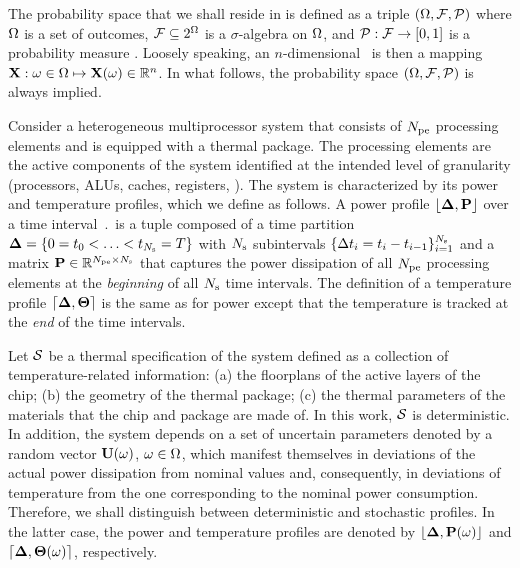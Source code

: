 The probability space that we shall reside in is defined as a triple $(\Omega, \mathcal{F}, \mathcal{P})$ where $\Omega$ is a set of outcomes, $\mathcal{F} \subseteq 2^\Omega$ is a $\sigma$-algebra on $\Omega$, and $\mathcal{P}: \mathcal{F} \to [0, 1]$ is a probability measure \cite{durrett2010}. Loosely speaking, an $n$-dimensional \rv\ is then a mapping $\mathbf{X}: \omega \in \Omega \mapsto \mathbf{X}(\omega) \in \mathbb{R}^n$. In what follows, the probability space $(\Omega, \mathcal{F}, \mathcal{P})$ is always implied.

Consider a heterogeneous multiprocessor system that consists of ${N_\text{pe}}$ processing elements and is equipped with a thermal package. The processing elements are the active components of the system identified at the intended level of granularity (processors, ALUs, caches, registers, \etc). The system is characterized by its power and temperature profiles, which we define as follows. A power profile $\profP$ over a time interval $\period$ is a tuple composed of a time partition $\boldsymbol{\Delta} = \{ 0 = t_0 < \dotsc < t_{N_\text{s}} = T \}$ with $N_\text{s}$ subintervals $\{ \Delta t_i = t_i - t_{i - 1} \}_{i = 1}^{N_\text{s}}$ and a matrix $\mP \in \real^{\cores \times \steps}$ that captures the power dissipation of all ${N_\text{pe}}$ processing elements at the \emph{beginning} of all $N_\text{s}$ time intervals. The definition of a temperature profile $\profT$ is the same as for power except that the temperature is tracked at the \emph{end} of the time intervals.

Let $\mathcal{S}$ be a thermal specification of the system defined as a collection of temperature-related information: (a) the floorplans of the active layers of the chip; (b) the geometry of the thermal package; (c) the thermal parameters of the materials that the chip and package are made of. In this work, $\mathcal{S}$ is deterministic. In addition, the system depends on a set of uncertain parameters denoted by a random vector $\mathbf{U}(\omega)$, $\omega \in \Omega$, which manifest themselves in deviations of the actual power dissipation from nominal values and, consequently, in deviations of temperature from the one corresponding to the nominal power consumption. Therefore, we shall distinguish between deterministic and stochastic profiles. In the latter case, the power and temperature profiles are denoted by $\profP{\o}$ and $\profT{\o}$, respectively.

